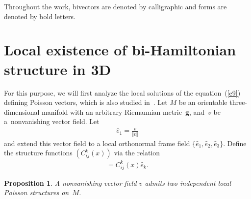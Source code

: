 \documentclass[10pt,a4paper]{amsart}
\numberwithin{equation}{section}
\newtheorem{Proposition}[Theorem]{Proposition}
 { \theoremstyle{definition}
\newtheorem{Definition}[Theorem]{Definition} }
\begin{document}
Throughout the work, bivectors are denoted by calligraphic and forms are denoted by bold letters.

\section{Local existence of bi-Hamiltonian structure in 3D}\label{section2}

For this purpose, we will f\/irst analyze the local solutions of the equation~(\ref{e9}) def\/ining Poisson vectors, which is also studied in~\cite{Bermejo}. Let $M$ be an orientable three-dimensional manifold with an arbitrary Riemannian metric~$\boldsymbol{g}$, and~$v$ be a~nonvanishing vector f\/ield. Let
\begin{gather*}
\widehat{e}_{1}=\frac{v}{\Vert v \Vert }
\end{gather*}
and extend this vector f\/ield to a local orthonormal frame f\/ield $\{\widehat{e}_{1},\widehat{e}_{2},\widehat{e}_{3}\} $. Def\/ine the structure functions $(C_{ij}^{k}(x)) $ via the relation
\begin{gather}
[ \widehat{e}_{i},\widehat{e}_{j}] =C_{ij}^{k}(x) \widehat{e}_{k}. \label{e14}
\end{gather}

\begin{Proposition}\label{proposition1}
A nonvanishing vector field $v$ admits two independent local Poisson structures on~$M$.
\end{Proposition}
\end{document}
